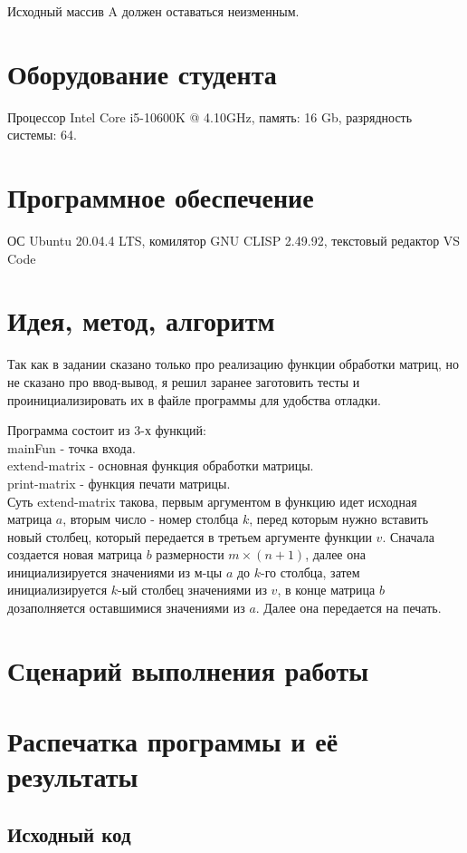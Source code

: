 \documentclass[12pt]{article}
\begin{document}
Исходный массив A должен оставаться неизменным.\\


\section{Оборудование студента}
Процессор Intel Core i5-10600K @ 4.10GHz, память: 16 Gb, разрядность системы: 64.

\section{Программное обеспечение}
ОС Ubuntu 20.04.4 LTS, комилятор GNU CLISP 2.49.92, текстовый редактор VS Code

\pagebreak
\section{Идея, метод, алгоритм}
Так как в задании сказано только про реализацию функции обработки матриц, но не сказано про ввод-вывод, я решил заранее заготовить тесты и проинициализировать их в файле программы для удобства отладки.

Программа состоит из 3-х функций:\\
mainFun - точка входа.\\
extend-matrix - основная функция обработки матрицы. \\
print-matrix - функция печати матрицы.\\

Суть extend-matrix такова, первым аргументом в функцию идет исходная матрица $a$, вторым число - номер столбца $k$, перед которым нужно вставить новый столбец, который передается в третьем аргументе функции $v$. Сначала создается новая матрица $b$ размерности $m×(n+1)$, далее она инициализируется значениями из м-цы $a$ до $k$-го столбца, затем инициализируется $k$-ый столбец значениями из $v$, в конце матрица $b$ дозаполняется оставшимися значениями из $a$. Далее она передается на печать.

\section{Сценарий выполнения работы}

\section{Распечатка программы и её результаты}

\subsection{Исходный код}

\end{document}
